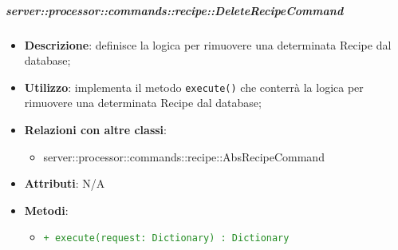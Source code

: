         \subparagraph{server::processor::commands::recipe::DeleteRecipeCommand} %
        \label{subp:bdsm_app_server_processor_commands_recipe_deleterecipecommand}
        \begin{itemize}
          \item \textbf{Descrizione}: definisce la logica per rimuovere una determinata Recipe dal database;
          \item \textbf{Utilizzo}: implementa il metodo \texttt{execute()} che conterrà la logica per rimuovere una determinata Recipe dal database;
          \item \textbf{Relazioni con altre classi}:
            \begin{itemize}
              \item server::processor::commands::recipe::AbsRecipeCommand
            \end{itemize}
          \item \textbf{Attributi}: N/A
          \item \textbf{Metodi}:
          \begin{itemize}
              \item \textcolor{forestgreen}{\texttt{+ execute(request: Dictionary) : Dictionary}}
          \end{itemize}
        \end{itemize}

